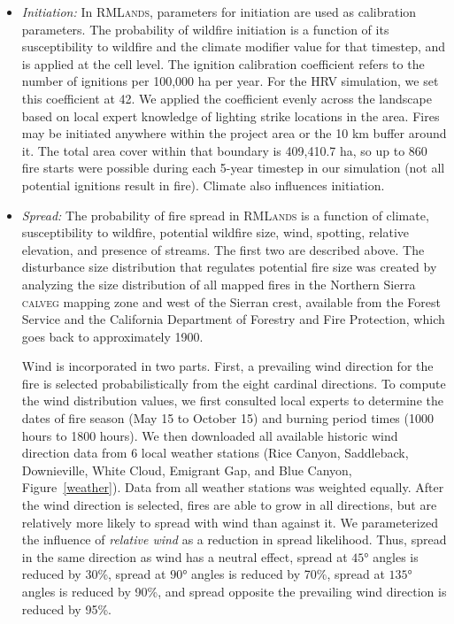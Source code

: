\begin{itemize}
\item \emph{Initiation:} In \textsc{RMLands}, parameters for initiation are used as calibration parameters. The probability of wildfire initiation is a function of its susceptibility to wildfire and the climate modifier value for that timestep, and is applied at the cell level. The ignition calibration coefficient refers to the number of ignitions per 100,000 ha per year. For the HRV simulation, we set this coefficient at 42. We applied the coefficient evenly across the landscape based on local expert knowledge of lighting strike locations in the area. Fires may be initiated anywhere within the project area or the 10 km buffer around it. The total area cover within that boundary is 409,410.7 ha, so up to 860 fire starts were possible during each 5-year timestep in our simulation (not all potential ignitions result in fire). Climate also influences initiation.


\item \emph{Spread:} The probability of fire spread in \textsc{RMLands} is a function of climate, susceptibility to wildfire, potential wildfire size, wind, spotting, relative elevation, and presence of streams. The first two are described above. The disturbance size distribution that regulates potential fire size was created by analyzing the size distribution of all mapped fires in the Northern Sierra \textsc{calveg} mapping zone and west of the Sierran crest, available from the Forest Service and the California Department of Forestry and Fire Protection, which goes back to approximately 1900. 

Wind is incorporated in two parts. First, a prevailing wind direction for the fire is selected probabilistically from the eight cardinal directions. To compute the wind distribution values, we first consulted local experts to determine the dates of fire season (May 15 to October 15) and burning period times (1000 hours to 1800 hours). We then downloaded all available historic wind direction data from 6 local weather stations (Rice Canyon, Saddleback, Downieville, White Cloud, Emigrant Gap, and Blue Canyon, Figure~\ref{weather}). Data from all weather stations was weighted equally. After the wind direction is selected, fires are able to grow in all directions, but are relatively more likely to spread with wind than against it. We parameterized the influence of \emph{relative wind} as a reduction in spread likelihood. Thus, spread in the same direction as wind has a neutral effect, spread at $\ang{45}$ angles is reduced by 30\%, spread at $\ang{90}$  angles is reduced by 70\%, spread at $\ang{135}$ angles is reduced by 90\%, and spread opposite the prevailing wind direction is reduced by 95\%. 


\end{itemize}
